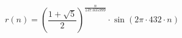\documentclass{article}
\begin{document}
\begin{center}
\Huge
\[
r(n) = \left( \frac{1 + \sqrt{5}}{2} \right)^{\frac{n}{137.035999}} \cdot \sin\left(2\pi \cdot 432 \cdot n\right)
\]
\end{center}
\end{document}
